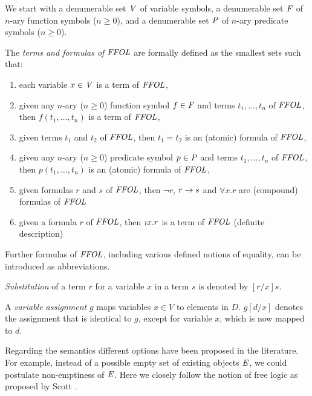 \begin{definition}
  We start with a denumerable set $\V$ of variable symbols, a denumerable set
  $\F$ of $n$-ary function symbols ($n\geq 0$), and a denumerable set
  $\P$ of $n$-ary predicate symbols ($n\geq 0$).

  The \emph{terms and formulas of $\FFOL$} are formally defined as the
  smallest sets such that:
\begin{enumerate}
\item each variable $x\in\V$ is a term of $\FFOL$, 
\item given any $n$-ary ($n\geq 0$) function symbol $f\in\F$ and terms
  $t_1,\ldots,t_n$ of $\FFOL$, then $f(t_1,\ldots,t_n)$ is a term of $\FFOL$, 
\item given terms $t_1$ and $t_2$ of $\FFOL$, then $t_1 = t_2$ is an
  (atomic) formula of $\FFOL$,
\item given any $n$-ary ($n\geq 0$) predicate symbol $p\in\P$ and terms
$t_1,\ldots,t_n$ of $\FFOL$, then $p(t_1,\ldots,t_n)$ is an (atomic)
formula of $\FFOL$, 
\item given formulas $r$ and $s$ of $\FFOL$, then $\neg r$, $r
  \Impl s$ and $\forall x. r$ are (compound) formulas of $\FFOL$
\item given a formula $r$ of $\FFOL$, then $\Descr x. r$ is a
  term of $\FFOL$ (definite  description)
\end{enumerate}
\end{definition}

Further formulas of $\FFOL$, including various defined notions of
equality, can be introduced as abbreviations. 

  \emph{Substitution} of a term $r$ for a variable $x$
  in a term $s$ is denoted by $[r/x]s$.  

A \emph{variable assignment} $g$ maps
variables $x\in V$ to elements in $D$. $g[d/x]$ denotes the
assignment that is identical to $g$, except for variable $x$, which is
now mapped to $d$.

Regarding the semantics different options have been proposed in the literature. For
example, instead of a possible empty set of existing objects $\ex$, we
could postulate non-emptiness of $\ex$. Here we closely
follow the notion of free logic as proposed by Scott \cite{Scott67}.



